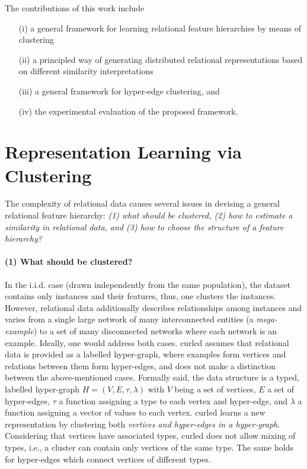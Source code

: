 The contributions of this work include
\begin{itemize}
	\item[(i)] a general framework for learning relational feature hierarchies by means of clustering
	\item[(ii)] a principled way of generating distributed relational representations based on different similarity interpretations
	\item[(iii)] a general framework for hyper-edge clustering, and
	\item[(iv)] the experimental evaluation of the proposed framework.
\end{itemize}



\section{Representation Learning via Clustering}
\label{sec:RL}

The complexity of relational data causes several issues in devising a general relational feature hierarchy: \textit{(1) what should be clustered, (2) how to estimate a similarity in relational data, and (3) how to choose the structure of a feature hierarchy? }


\paragraph{(1) What should be clustered?}
In the i.i.d. case (drawn independently from the same population), the dataset contains only instances and their features, thus, one clusters the instances.
However, relational data additionally describes relationships among instances and  varies from a single large network of many interconnected entities (a \textit{mega-example}) to a set of many disconnected networks where each network is an example.
Ideally, one would address both cases.
\gls{curled} assumes that relational data is provided as a labelled hyper-graph, where examples form vertices and relations between them form hyper-edges, and does not make a distinction between the above-mentioned cases.
Formally said, the data structure is a typed, labelled hyper-graph $H = (V,E, \tau, \lambda)$ with $V$ being a set of vertices, $E$ a set of hyper-edges, $\tau$  a function  assigning a type to each vertex and hyper-edge, and $\lambda$ a function assigning a vector of values to each vertex.
\gls{curled} learns a new representation by clustering both \textit{vertices and hyper-edges in a hyper-graph}.
Considering that vertices have associated types, \gls{curled} does not allow mixing of types, i.e., a cluster can contain only vertices of the same type.
The same holds for hyper-edges which connect vertices of different types.





